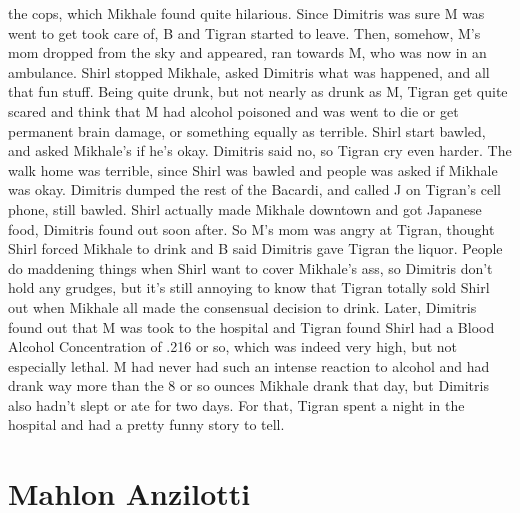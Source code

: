 \documentclass[12pt]{book}
\begin{document}
the cops, which Mikhale found quite hilarious. Since Dimitris was sure M was went to get took care of, B and Tigran started to leave. Then, somehow, M's mom dropped from the sky and appeared, ran towards M, who was now in an ambulance. Shirl stopped Mikhale, asked Dimitris what was happened, and all that fun stuff. Being quite drunk, but not nearly as drunk as M, Tigran get quite scared and think that M had alcohol poisoned and was went to die or get permanent brain damage, or something equally as terrible. Shirl start bawled, and asked Mikhale's if he's okay. Dimitris said no, so Tigran cry even harder. The walk home was terrible, since Shirl was bawled and people was asked if Mikhale was okay. Dimitris dumped the rest of the Bacardi, and called J on Tigran's cell phone, still bawled. Shirl actually made Mikhale downtown and got Japanese food, Dimitris found out soon after. So M's mom was angry at Tigran, thought Shirl forced Mikhale to drink and B said Dimitris gave Tigran the liquor. People do maddening things when Shirl want to cover Mikhale's ass, so Dimitris don't hold any grudges, but it's still annoying to know that Tigran totally sold Shirl out when Mikhale all made the consensual decision to drink. Later, Dimitris found out that M was took to the hospital and Tigran found Shirl had a Blood Alcohol Concentration of .216 or so, which was indeed very high, but not especially lethal. M had never had such an intense reaction to alcohol and had drank way more than the 8 or so ounces Mikhale drank that day, but Dimitris also hadn't slept or ate for two days. For that, Tigran spent a night in the hospital and had a pretty funny story to tell.



\chapter{Mahlon Anzilotti}
\end{document}

